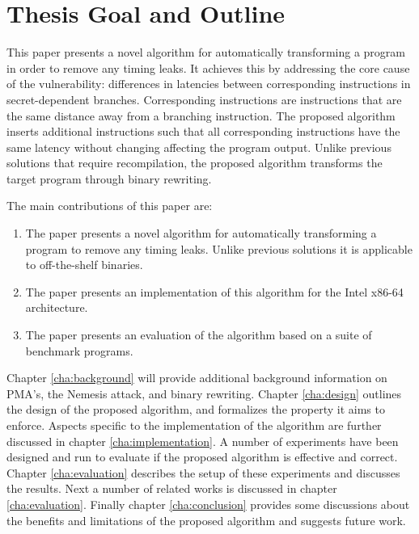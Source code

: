 \section{Thesis Goal and Outline}
This paper presents a novel algorithm for automatically transforming a program in order to remove any timing leaks. It achieves this by addressing the core cause of the vulnerability: differences in 
latencies between corresponding instructions in secret-dependent branches. Corresponding instructions are instructions that are the same distance away from a branching instruction. 
The proposed algorithm inserts additional instructions such that all corresponding instructions have the same latency without changing affecting the program output. 
Unlike previous solutions that require recompilation, the proposed algorithm transforms the target program through binary rewriting. 

The main contributions of this paper are:
\begin{enumerate}
\item The paper presents a novel algorithm for automatically transforming a program to remove any timing leaks. Unlike previous solutions it is applicable to off-the-shelf binaries. 
\item The paper presents an implementation of this algorithm for the Intel x86-64 architecture. 
\item The paper presents an evaluation of the algorithm based on a suite of benchmark programs. 
\end{enumerate}

Chapter \ref{cha:background} will provide additional background information on PMA's, the Nemesis attack, and binary rewriting. 
Chapter \ref{cha:design} outlines the design of the proposed algorithm, and formalizes the property it aims to enforce.  
Aspects specific to the implementation of the algorithm are further discussed in chapter \ref{cha:implementation}. 
A number of experiments have been designed and run to evaluate if the proposed algorithm is effective and correct. 
Chapter \ref{cha:evaluation} describes the setup of these experiments and discusses the results. 
Next a number of related works is discussed in chapter \ref{cha:evaluation}.
Finally chapter \ref{cha:conclusion} provides some discussions about the benefits and limitations of the proposed algorithm and suggests 
future work. 